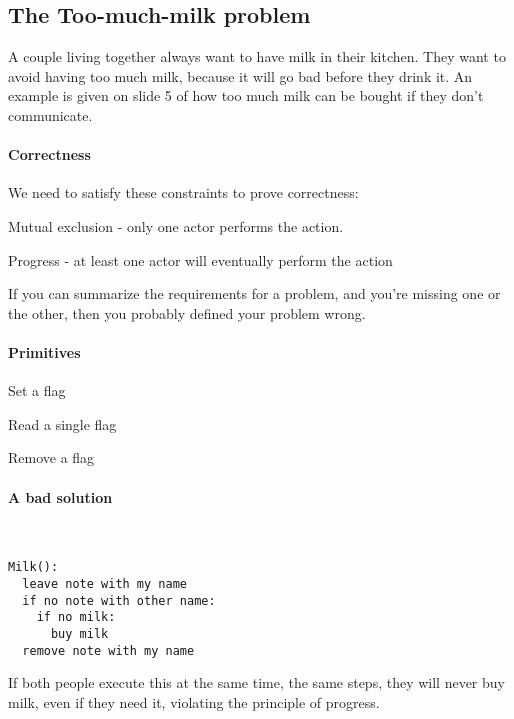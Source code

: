 \documentclass[a4paper]{article}
\newenvironment{itemize*}%
  {\begin{itemize}%
    \setlength{\itemsep}{0pt}%
    \setlength{\parsep}{0pt}%
    \setlength{\parskip}{0pt}}%
  {\end{itemize}}
\begin{document}
\subsection{The Too-much-milk problem}
A couple living together always want to have milk in their kitchen.
They want to avoid having too much milk, because it will go bad before they drink it.
An example is given on slide 5 of how too much milk can be bought if they don't communicate.

\paragraph{Correctness}
We need to satisfy these constraints to prove correctness:

\begin{itemize*}
  \item Mutual exclusion - only one actor performs the action.
  \item Progress - at least one actor will eventually perform the action
\end{itemize*}

If you can summarize the requirements for a problem, and you're missing one or the other, then you probably defined your problem wrong.

\paragraph{Primitives}

\begin{itemize*}
  \item Set a flag
  \item Read a single flag
  \item Remove a flag
\end{itemize*}

\paragraph{A bad solution}\ \\

\begin{lstlisting}[frame=L]
Milk():
  leave note with my name
  if no note with other name:
    if no milk:
      buy milk
  remove note with my name
\end{lstlisting}

If both people execute this at the same time, the same steps, they will never buy milk, even if they need it, violating the principle of progress.
\end{document}
